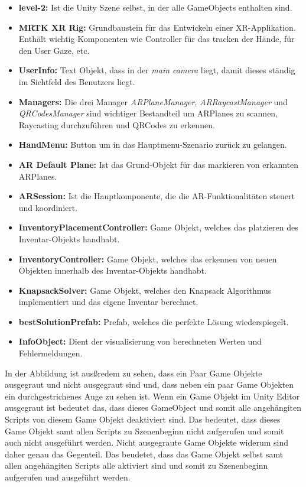 \begin{itemize}
    \item \textbf{level-2:} Ist die Unity Szene selbst, in der alle GameObjects enthalten sind.
    \item \textbf{MRTK XR Rig:} Grundbaustein für das Entwickeln einer XR-Applikation. Enthält wichtig Komponenten
    wie Controller für das tracken der Hände, für den User Gaze, etc.
    \item \textbf{UserInfo:} Text Objekt, dass in der \textit{main camera } liegt, damit dieses ständig im Sichtfeld des
    Benutzers liegt.
    \item \textbf{Managers:} Die drei Manager \textit{ARPlaneManager}, \textit{ARRaycastManager} und \textit{QRCodesManager}
    sind wichtiger Bestandteil um ARPlanes zu scannen, Raycasting durchzuführen und QRCodes zu erkennen.
    \item \textbf{HandMenu:} Button um in das Hauptmenu-Szenario zurück zu gelangen.
    \item \textbf{AR Default Plane:} Ist das Grund-Objekt für das markieren von erkannten ARPlanes.
    \item \textbf{ARSession:} Ist die Hauptkomponente, die die AR-Funktionalitäten steuert und koordiniert.
    \item \textbf{InventoryPlacementController:} Game Objekt, welches das platzieren des Inventar-Objekts handhabt.
    \item \textbf{InventoryController:} Game Objekt, welches das erkennen von neuen Objekten innerhalb des Inventar-Objekts handhabt.
    \item \textbf{KnapsackSolver:} Game Objekt, welches den Knapsack Algorithmus implementiert und das eigene Inventar berechnet.
    \item \textbf{bestSolutionPrefab:} Prefab, welches die perfekte Lösung wiederspiegelt.
    \item \textbf{InfoObject:} Dient der visualisierung von berechneten Werten und Fehlermeldungen.
\end{itemize}

In der Abbildung ist ausßredem zu sehen, dass ein Paar Game Objekte ausgegraut und nicht ausgegraut sind und, dass neben ein paar Game Objekten ein durchgestrichenes Auge zu sehen ist.
Wenn ein Game Objekt im Unity Editor ausgegraut ist bedeutet das, dass dieses GameObject und somit alle angehängiten Scripts von diesem Game Objekt deaktiviert sind.
Das bedeutet, dass dieses Game Objekt samt allen Scripts zu Szenenbeginn nicht aufgerufen und somit auch nicht ausgeführt werden. Nicht ausgegraute Game Objekte widerum sind
daher genau das Gegenteil. Das beudetet, dass das Game Objekt selbst samt allen angehängiten Scripts alle aktiviert sind und somit zu Szenenbeginn aufgerufen und ausgeführt werden.

